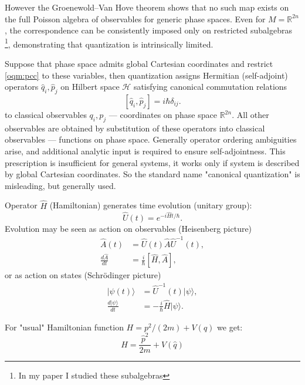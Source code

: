 However the Groenewold--Van Hove theorem shows that no such map exists on the full 
Poisson algebra of observables for generic phase spaces. 
Even for $M=\mathbb{R}^{2n}$, the correspondence can be consistently imposed only on 
restricted subalgebras \footnote{ In my paper \cite{panfil-q} I studied these subalgebras},
demonstrating that quantization is intrinsically limited.

Suppose that phase space admits global Cartesian coordinates 
and restrict \eqref{oqm:pcc} to these variables, 
then quantization assigns Hermitian (self-adjoint) operators
$\hat q_i, \hat p_j$ on Hilbert space $ \mathcal{H} $
satisfying canonical commutation relations
\begin{equation}
    \label{oqm:ccr}
    [\hat q_i, \hat p_j] = i\hbar \delta_{ij}.
\end{equation}
to classical observables $q_i, p_j$ --- coordinates on phase space $ \mathbb{R}^{2 n} $.
All other observables are obtained by substitution of these operators into
classical observables --- functions on phase space.
Generally operator ordering ambiguities arise,  
and additional analytic input is required to ensure self-adjointness.
This prescription is insufficient for general systems, it works only
if system is described by global Cartesian coordinates.
So the standard name "canonical quantization" is misleading, but generally used.

Operator $ \hat H$ (Hamiltonian) generates time evolution (unitary group):
    \begin{equation}
       \label {oqm:evol}
 \hat U(t) = e^{-i \hat H t/ \hbar}.
    \end{equation}
    Evolution may be seen as action on observables (Heisenberg picture)
\begin{align}
   \hat A(t)&= \hat U(t) \hat A \hat U^{-1}(t), \label {oqm:heis1}\\
    \frac{d \hat A}{d t} &= \frac{i}{\hbar}[\hat H,\hat A],\label{oqm:heis2}
\end{align}
    or as action on states (Schr\"odinger picture)
\begin{align}
    |\psi(t)\rangle&= \hat U^{-1}(t) |\psi \rangle, \label{oqm:schr1} \\
    \frac{d |\psi \rangle}{d t} &=-\frac{i}{\hbar} \hat H |\psi \rangle. \label{oqm:schr2}
\end{align}

For "usual" Hamiltonian function $ H=p^2/(2 m) +V(q) $ we get:
\begin{equation}
   \label {oqm:ham}
    \hat H = \frac{\hat p^2}{2 m}+V(\hat q)
\end{equation}


